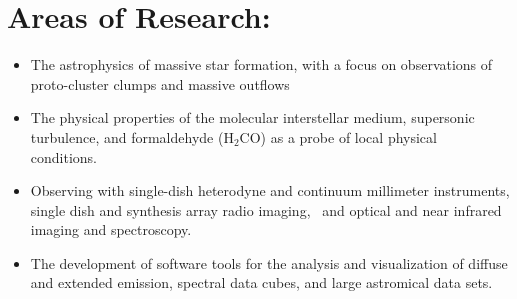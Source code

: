 \section*{Areas of Research: }
\begin{itemize}
    \item The astrophysics of massive star formation, with a focus on
        observations of proto-cluster clumps and massive outflows
    \item The physical properties of the molecular interstellar medium,
        supersonic turbulence, and formaldehyde (H$_2$CO) as a probe of local
        physical conditions. 
    \item Observing with single-dish heterodyne and continuum millimeter
        instruments, single dish and synthesis array radio imaging,  and
        optical and near infrared imaging and spectroscopy. 
    \item The development of software tools for the analysis and visualization
        of diffuse and extended emission, spectral data cubes, and large
        astromical data sets.
\end{itemize}

